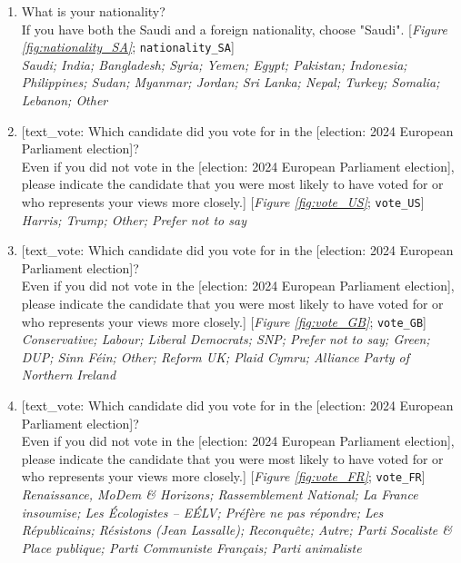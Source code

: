  \begin{enumerate}[resume] 
\item  \label{q:nationality_SA} What is your nationality?\\If you have both the Saudi and a foreign nationality, choose "Saudi". [\textit{Figure \ref{fig:nationality_SA}}; 
\verb|nationality_SA|]
  \\ \textit{Saudi; India; Bangladesh; Syria; Yemen; Egypt; Pakistan; Indonesia; Philippines; Sudan; Myanmar; Jordan; Sri Lanka; Nepal; Turkey; Somalia; Lebanon; Other}

\item  \label{q:vote_US} [text\_vote: Which candidate did you vote for in the [election: 2024 European Parliament election]?\\Even if you did not vote in the [election: 2024 European Parliament election], please indicate the candidate that you were most likely to have voted for or who represents your views more closely.] [\textit{Figure \ref{fig:vote_US}}; 
\verb|vote_US|]
  \\ \textit{Harris; Trump; Other; Prefer not to say}

\item  \label{q:vote_GB} [text\_vote: Which candidate did you vote for in the [election: 2024 European Parliament election]?\\Even if you did not vote in the [election: 2024 European Parliament election], please indicate the candidate that you were most likely to have voted for or who represents your views more closely.] [\textit{Figure \ref{fig:vote_GB}}; 
\verb|vote_GB|]
  \\ \textit{Conservative; Labour; Liberal Democrats; SNP; Prefer not to say; Green; DUP; Sinn Féin; Other; Reform UK; Plaid Cymru; Alliance Party of Northern Ireland}

\item  \label{q:vote_FR} [text\_vote: Which candidate did you vote for in the [election: 2024 European Parliament election]?\\Even if you did not vote in the [election: 2024 European Parliament election], please indicate the candidate that you were most likely to have voted for or who represents your views more closely.] [\textit{Figure \ref{fig:vote_FR}}; 
\verb|vote_FR|]
  \\ \textit{Renaissance, MoDem \& Horizons; Rassemblement National; La France insoumise; Les Écologistes – EÉLV; Préfère ne pas répondre; Les Républicains; Résistons (Jean Lassalle); Reconquête; Autre; Parti Socaliste \& Place publique; Parti Communiste Français; Parti animaliste}


\end{enumerate}

